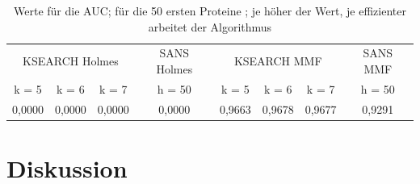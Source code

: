 \documentclass{article}
\begin{document}
  \begin{table}[h]
    \begin{center}
    \caption{Werte für die AUC; für die 50 ersten Proteine ; je höher der Wert, je effizienter arbeitet der     Algorithmus}
    \leftskip=-0.5cm
    \begin{tabular}{cccccccc}
      \hline
      \multicolumn{3}{c}{KSEARCH Holmes} & SANS Holmes &\multicolumn{3}{c}{KSEARCH MMF} & SANS MMF\\
      \cline{1-3}\cline{5-7}
      k = 5 & k = 6 & k = 7 & h = 50 & k = 5 & k = 6 & k = 7 & h = 50 \\
      \hline
      0,0000 & 0,0000 & 0,0000 & 0,0000 & 0,9663 & 0,9678 & 0,9677 & 0,9291 \\
      \hline
    \end{tabular}
    \end{center}
  \end{table}

\section{Diskussion}

{}

\end{document}
